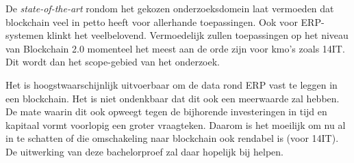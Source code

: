 De \emph{state-of-the-art} rondom het gekozen onderzoeksdomein laat vermoeden dat blockchain veel in petto heeft voor allerhande toepassingen. Ook voor ERP-systemen klinkt het veelbelovend.	Vermoedelijk zullen toepassingen op het niveau van Blockchain 2.0 momenteel het meest aan de orde zijn voor kmo's zoals 14IT. Dit wordt dan het scope-gebied van het onderzoek.

Het is hoogstwaarschijnlijk uitvoerbaar om de data rond ERP vast te leggen in een blockchain. Het is niet ondenkbaar dat dit ook een meerwaarde zal hebben. De mate waarin dit ook opweegt tegen de bijhorende investeringen in tijd en kapitaal vormt voorlopig een groter vraagteken. Daarom is het moeilijk om nu al in te schatten of die omschakeling naar blockchain ook rendabel is (voor 14IT). De uitwerking van deze bachelorproef zal daar hopelijk bij helpen.

